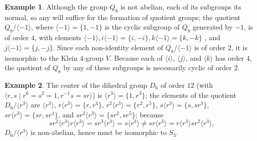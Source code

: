 \documentclass[12pt]{article}
\theoremstyle{plain}
\theoremstyle{definition}
\newtheorem*{example*}{Example}
\newcommand{\set}[1]{\{#1\}}
\newcommand{\vbrack}[1]{\langle#1\rangle}
\begin{document}
\begin{example*}
Although the group $Q_8$ is not abelian, each of its subgroups its normal, so any will suffice for the formation
of quotient groups; the quotient $Q_8/\vbrack{-1}$, where $\vbrack{-1}=\set{1,-1}$ is the cyclic subgroup of $Q_8$ generated by $-1$, is of order $4$, with elements $\vbrack{-1},i\vbrack{-1}=\set{i,-i},k\vbrack{-1}=\set{k,-k}$ , and $j\vbrack{-1}=\set{j,-j}$. Since each non-identity element of $Q_8/\vbrack{-1}$ is of order $2$, it is isomorphic to the Klein $4$-group $V$. Because each of $\vbrack{i}$, $\vbrack{j}$, and $\vbrack{k}$ has order $4$, the quotient of $Q_8$ by any of these subgroups is necessarily cyclic of order $2$.
\end{example*}

\begin{example*}
The center of the dihedral group $D_6$ of order $12$ (with  $\vbrack{r,s\mid r^6=s^2=1,r^{-1}s=sr}$) is $\vbrack{r^3}=\set{1,r^3}$; the elements of the quotient $D_6/\vbrack{r^3}$ are $\vbrack{r^3}$, $r\vbrack{r^3}=\set{r,r^4}$, $r^2\vbrack{r^3}=\set{r^2,r^5}$, $s\vbrack{r^3}=\set{s,sr^3}$, $sr\vbrack{r^3}=\set{sr,sr^4}$, and $sr^2\vbrack{r^3}=\set{sr^2,sr^5}$; because
\begin{equation*} 
sr^2\vbrack{r^3}r\vbrack{r^3}=sr^3\vbrack{r^3}=s\vbrack{r^3}\neq sr\vbrack{r^3}=r\vbrack{r^3}sr^2\vbrack{r^3}\text{,}
\end{equation*}
$D_6/\vbrack{r^3}$ is non-abelian, hence must be isomorphic to $S_3$.
\end{example*}

\end{document}

